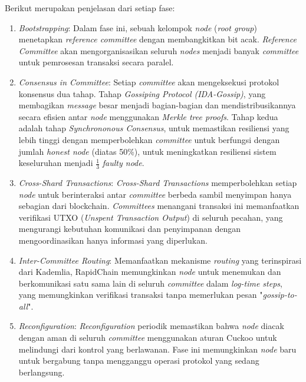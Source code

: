 Berikut merupakan penjelasan dari setiap fase:

\begin{enumerate}
  \item \textit{Bootstrapping}: Dalam fase ini, sebuah kelompok \textit{node} (\textit{root group}) menetapkan \textit{reference committee} dengan membangkitkan bit acak. \textit{Reference Committee} akan mengorganisasikan seluruh \textit{nodes} menjadi banyak \textit{committee} untuk pemrosesan transaksi secara paralel.
  \item \textit{Consensus in Committee}: Setiap \textit{committee} akan mengeksekusi protokol konsensus dua tahap. Tahap \textit{Gossiping Protocol (IDA-Gossip)}, yang membagikan \textit{message} besar menjadi bagian-bagian dan mendistribusikannya secara efisien antar \textit{node} menggunakan \textit{Merkle tree proofs}. Tahap kedua adalah tahap \textit{Synchrononous Consensus}, untuk memastikan resiliensi yang lebih tinggi dengan memperbolehkan \textit{committee} untuk berfungsi dengan jumlah \textit{honest node} (diatas 50\%), untuk meningkatkan resiliensi sistem keseluruhan menjadi $\frac{1}{3}$ \textit{faulty node}. 
  \item \textit{Cross-Shard Transactions}: \textit{Cross-Shard Transactions} memperbolehkan setiap \textit{node} untuk berinteraksi antar \textit{committee} berbeda sambil menyimpan hanya sebagian dari blockchain. \textit{Committees} menangani transaksi ini memanfaatkan verifikasi UTXO (\textit{Unspent Transaction Output}) di seluruh pecahan, yang mengurangi kebutuhan komunikasi dan penyimpanan dengan mengoordinasikan hanya informasi yang diperlukan.
  \item \textit{Inter-Committee Routing}: Memanfaatkan mekanisme \textit{routing} yang terinspirasi dari Kademlia, RapidChain memungkinkan \textit{node} untuk menemukan dan berkomunikasi satu sama lain di seluruh \textit{committee} dalam \textit{log-time steps}, yang memungkinkan verifikasi transaksi tanpa memerlukan pesan "\textit{gossip-to-all}". 
  \item \textit{Reconfiguration}: \textit{Reconfiguration} periodik memastikan bahwa \textit{node} diacak dengan aman di seluruh \textit{committee} menggunakan aturan Cuckoo untuk melindungi dari kontrol yang berlawanan. Fase ini memungkinkan \textit{node} baru untuk bergabung tanpa mengganggu operasi protokol yang sedang berlangsung.
\end{enumerate}